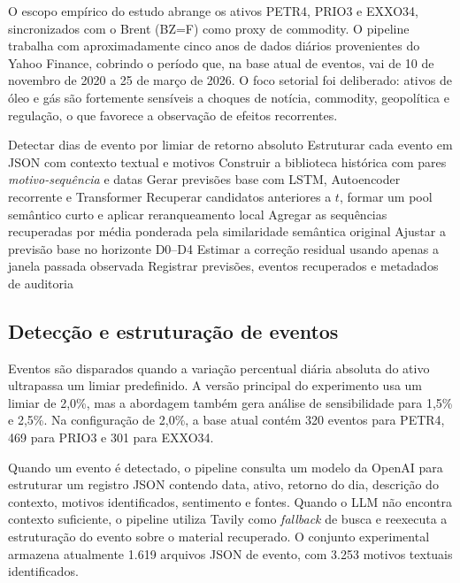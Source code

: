 \documentclass[12pt]{article}
\begin{document}
O escopo empírico do estudo abrange os ativos PETR4, PRIO3 e EXXO34, sincronizados com o Brent (BZ=F) como proxy de commodity. O pipeline trabalha com aproximadamente cinco anos de dados diários provenientes do Yahoo Finance, cobrindo o período que, na base atual de eventos, vai de 10 de novembro de 2020 a 25 de março de 2026. O foco setorial foi deliberado: ativos de óleo e gás são fortemente sensíveis a choques de notícia, commodity, geopolítica e regulação, o que favorece a observação de efeitos recorrentes.

\begin{algorithm}[H]
\caption{Resumo do pipeline híbrido proposto}
\label{alg:pipeline}
\small
\begin{algorithmic}[1]
\STATE Detectar dias de evento por limiar de retorno absoluto
\STATE Estruturar cada evento em JSON com contexto textual e motivos
\STATE Construir a biblioteca histórica com pares \textit{motivo-sequência} e datas
\STATE Gerar previsões base com LSTM, Autoencoder recorrente e Transformer
    \STATE Recuperar candidatos anteriores a $t$, formar um pool semântico curto e aplicar reranqueamento local
    \STATE Agregar as sequências recuperadas por média ponderada pela similaridade semântica original
    \STATE Ajustar a previsão base no horizonte D0--D4
    \STATE Estimar a correção residual usando apenas a janela passada observada
\ENDFOR
\STATE Registrar previsões, eventos recuperados e metadados de auditoria
\end{algorithmic}
\end{algorithm}

\subsection{Detecção e estruturação de eventos}

Eventos são disparados quando a variação percentual diária absoluta do ativo ultrapassa um limiar predefinido. A versão principal do experimento usa um limiar de 2,0\%, mas a abordagem também gera análise de sensibilidade para 1,5\% e 2,5\%. Na configuração de 2,0\%, a base atual contém 320 eventos para PETR4, 469 para PRIO3 e 301 para EXXO34.

Quando um evento é detectado, o pipeline consulta um modelo da OpenAI para estruturar um registro JSON contendo data, ativo, retorno do dia, descrição do contexto, motivos identificados, sentimento e fontes. Quando o LLM não encontra contexto suficiente, o pipeline utiliza Tavily como \textit{fallback} de busca e reexecuta a estruturação do evento sobre o material recuperado. O conjunto experimental armazena atualmente 1.619 arquivos JSON de evento, com 3.253 motivos textuais identificados.
\end{document}
